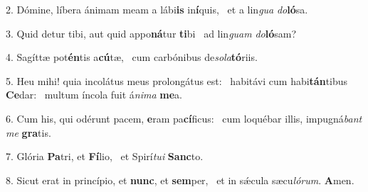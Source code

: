 2. Dómine, líbera ánimam meam a lábi\textbf{is} in\textbf{í}quis, \ast\  et a lin\textit{gua} \textit{do}\textbf{ló}sa.\

3. Quid detur tibi, aut quid appo\textbf{ná}tur \textbf{ti}bi \ast\  ad lin\textit{guam} \textit{do}\textbf{ló}sam?\

4. Sagíttæ pot\textbf{én}tis a\textbf{cú}tæ, \ast\  cum carbónibus de\textit{so}\textit{la}\textbf{tó}riis.\

5. Heu mihi! quia incolátus meus prolongátus est: \dag\  habitávi cum habi\textbf{tán}tibus \textbf{Ce}dar: \ast\  multum íncola fuit á\textit{ni}\textit{ma} \textbf{me}a.\

6. Cum his, qui odérunt pacem, \textbf{e}ram pa\textbf{cí}ficus: \ast\  cum loquébar illis, impugná\textit{bant} \textit{me} \textbf{gra}tis.\

7. Glória \textbf{Pa}tri, et \textbf{Fí}lio, \ast\  et Spirí\textit{tu}\textit{i} \textbf{Sanc}to.\

8. Sicut erat in princípio, et \textbf{nunc}, et \textbf{sem}per, \ast\  et in sǽcula sæcu\textit{ló}\textit{rum}. \textbf{A}men.\

